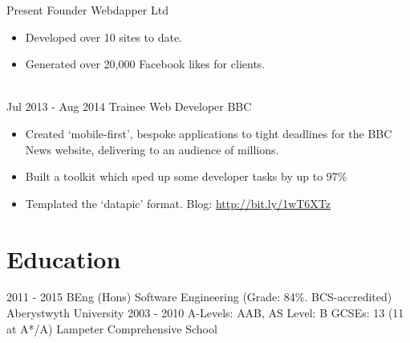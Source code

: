 \documentclass[letterpaper]{twentysecondcv} %
\begin{document}
\begin{twenty}
		{Present}
        {Founder}
        {Webdapper Ltd}
        {}
        {
        \begin{itemize}
        \item Developed over 10 sites to date.
        \item Generated over 20,000 Facebook likes for clients.
    \end{itemize}
    	}
    \\
    \twentyitem
   		{Jul 2013 -}
		{Aug 2014}
        {Trainee Web Developer}
        {BBC}
        {}
        {
        {\begin{itemize}
        \item Created `mobile-first', bespoke applications to tight deadlines for the BBC News website, delivering to an audience of millions.
        \item Built a toolkit which sped up some developer tasks by up to 97\%
        \item Templated the ‘datapic’ format. Blog: \url{http://bit.ly/1wT6XTz}
    \end{itemize}}
        }

\end{twenty}

\section{Education}

\begin{twenty} %
	\twentyitem
    	{2011 - 2015}
        {}
        {BEng (Hons) Software Engineering \textnormal{(Grade: 84\%. BCS-accredited)}}
        {Aberystwyth University}
        {}
        {}
	\twentyitem
    	{2003 - 2010}
		{}
        {A-Levels: \textnormal{AAB}, AS Level: \textnormal{B}
        \newline
        GCSEs: \textnormal{13 (11 at A*/A)}
        }
        {Lampeter Comprehensive School}
        {}
        {}
\end{twenty}
\end{document}
